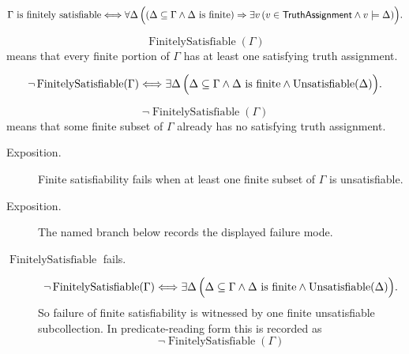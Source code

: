 \begin{remark*}
\[
\Gamma\text{ is finitely satisfiable}
\Longleftrightarrow
\forall\Delta\,\Bigl((\Delta\subseteq\Gamma\land \Delta\text{ is finite})
\Rightarrow \exists v\,(v\in\mathsf{TruthAssignment}\land v\models\Delta)\Bigr).
\]
\end{remark*}

\begin{remark*}
\[
\operatorname{FinitelySatisfiable}(\Gamma)
\]
means that every finite portion of \(\Gamma\) has at least one satisfying truth
assignment.
\end{remark*}

\begin{remark*}
\[
\neg\operatorname{FinitelySatisfiable}(\Gamma)
\Longleftrightarrow
\exists\Delta\,\Bigl(\Delta\subseteq\Gamma\land \Delta\text{ is finite}\land
\operatorname{Unsatisfiable}(\Delta)\Bigr).
\]
\end{remark*}

\begin{remark*}
\[
\neg\operatorname{FinitelySatisfiable}(\Gamma)
\]
means that some finite subset of \(\Gamma\) already has no satisfying truth
assignment.
\end{remark*}

\begin{remark*}
\begin{description}
  \item[Exposition.] Finite satisfiability fails when at least one finite subset of \(\Gamma\) is
unsatisfiable.
\end{description}
\end{remark*}

\begin{remark*}
\begin{description}
  \item[Exposition.] The named branch below records the displayed failure mode.
\item[\(\operatorname{FinitelySatisfiable}\) fails.] \[
\neg\operatorname{FinitelySatisfiable}(\Gamma)
\Longleftrightarrow
\exists\Delta\,\Bigl(\Delta\subseteq\Gamma\land \Delta\text{ is finite}\land
\operatorname{Unsatisfiable}(\Delta)\Bigr).
\]
So failure of finite satisfiability is witnessed by one finite unsatisfiable
subcollection.
  In predicate-reading form this is recorded as
  \[
  \neg\operatorname{FinitelySatisfiable}(\Gamma)
  \]
\end{description}
\end{remark*}

